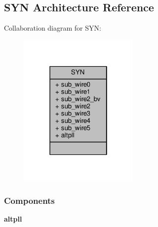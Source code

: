 \subsection{S\+YN Architecture Reference}
\label{classfpga__pll_1_1SYN}


Collaboration diagram for S\+YN\+:\nopagebreak
\begin{figure}[H]
\begin{center}
\leavevmode
\includegraphics[width=166pt]{d1/d2e/classfpga__pll_1_1SYN__coll__graph}
\end{center}
\end{figure}
\subsubsection*{Components}
 \begin{DoxyCompactItemize}
\item 
{\bf altpll}  {\bfseries }  
\end{DoxyCompactItemize}
